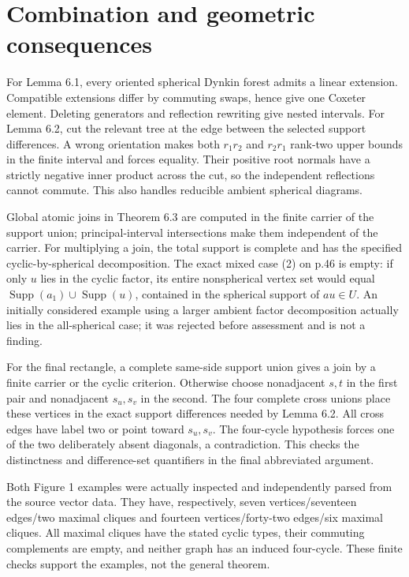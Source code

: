 \documentclass[10pt]{article}
\begin{document}
\section*{Combination and geometric consequences}
For Lemma 6.1, every oriented spherical Dynkin forest admits a linear extension. Compatible extensions differ by commuting swaps, hence give one Coxeter element. Deleting generators and reflection rewriting give nested intervals. For Lemma 6.2, cut the relevant tree at the edge between the selected support differences. A wrong orientation makes both \(r_1r_2\) and \(r_2r_1\) rank-two upper bounds in the finite interval and forces equality. Their positive root normals have a strictly negative inner product across the cut, so the independent reflections cannot commute. This also handles reducible ambient spherical diagrams.\par
Global atomic joins in Theorem 6.3 are computed in the finite carrier of the support union; principal-interval intersections make them independent of the carrier. For multiplying a join, the total support is complete and has the specified cyclic-by-spherical decomposition. The exact mixed case (2) on p.46 is empty: if only \(u\) lies in the cyclic factor, its entire nonspherical vertex set would equal \(\operatorname{Supp}(a_1)\cup\operatorname{Supp}(u)\), contained in the spherical support of \(au\in U\). An initially considered example using a larger ambient factor decomposition actually lies in the all-spherical case; it was rejected before assessment and is not a finding.\par
For the final rectangle, a complete same-side support union gives a join by a finite carrier or the cyclic criterion. Otherwise choose nonadjacent \(s,t\) in the first pair and nonadjacent \(s_u,s_v\) in the second. The four complete cross unions place these vertices in the exact support differences needed by Lemma 6.2. All cross edges have label two or point toward \(s_u,s_v\). The four-cycle hypothesis forces one of the two deliberately absent diagonals, a contradiction. This checks the distinctness and difference-set quantifiers in the final abbreviated argument.\par
Both Figure 1 examples were actually inspected and independently parsed from the source vector data. They have, respectively, seven vertices/seventeen edges/two maximal cliques and fourteen vertices/forty-two edges/six maximal cliques. All maximal cliques have the stated cyclic types, their commuting complements are empty, and neither graph has an induced four-cycle. These finite checks support the examples, not the general theorem.\par
\end{document}
